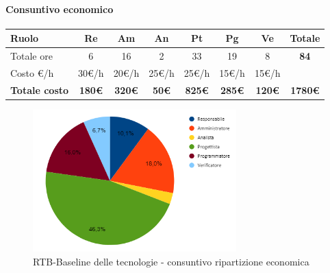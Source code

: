 \paragraph{Consuntivo economico}
\begin{center}
	\renewcommand{\arraystretch}{1.8}
	\begin{tabular}{ |m{6em}|c|c|c|c|c|c|c| }
	\hline
	\textbf{Ruolo} & \textbf{Re} & \textbf{Am} &  \textbf{An} &  \textbf{Pt} &  \textbf{Pg} &  \textbf{Ve} &  \textbf{Totale}\\
    \hline
    Totale ore & 6 & 16 & 2 & 33 & 19 & 8 & \textbf{84}\\
    \hline
    Costo \euro/h & 30\euro/h & 20\euro/h & 25\euro/h & 25\euro/h & 15\euro/h & 15\euro/h & \\
    \hline
    \textbf{Totale costo} & \textbf{180\euro} & \textbf{320\euro} &  \textbf{50\euro} &  \textbf{825\euro} &  \textbf{285\euro} &  \textbf{120\euro} &  \textbf{1780\euro}\\
    \hline
	\end{tabular}
    \begin{figure}[H]
        \centering\includegraphics[width=0.7\textwidth, height=0.7\textheight, keepaspectratio]{images/consuntivo/RTB-tecnologico-costo.png}
        \caption{RTB-Baseline delle tecnologie - consuntivo ripartizione economica}
    \end{figure}
\end{center}

